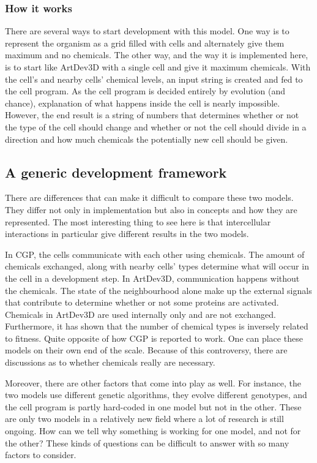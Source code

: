 \subsubsection{How it works}
There are several ways to start development with this model. One way is to represent the organism as a grid filled with cells and alternately give them maximum and no chemicals. The other way, and the way it is implemented here, is to start like ArtDev3D with a single cell and give it maximum chemicals. With the cell's and nearby cells' chemical levels, an input string is created and fed to the cell program. As the cell program is decided entirely by evolution (and chance), explanation of what happens inside the cell is nearly impossible. However, the end result is a string of numbers that determines whether or not the type of the cell should change and whether or not the cell should divide in a direction and how much chemicals the potentially new cell should be given.


\subsection{A generic development framework}
There are differences that can make it difficult to compare these two models. They differ not only in implementation but also in concepts and how they are represented. The most interesting thing to see here is that intercellular interactions in particular give different results in the two models.

In CGP, the cells communicate with each other using chemicals. The amount of chemicals exchanged, along with nearby cells' types determine what will occur in the cell in a development step. In ArtDev3D, communication happens without the chemicals. The state of the neighbourhood alone make up the external signals that contribute to determine whether or not some proteins are activated. Chemicals in ArtDev3D are used internally only and are not exchanged. Furthermore, it has shown that the number of chemical types is inversely related to fitness. Quite opposite of how CGP is reported to work. One can place these models on their own end of the scale. Because of this controversy, there are discussions as to whether chemicals really are necessary.

Moreover, there are other factors that come into play as well. For instance, the two models use different genetic algorithms, they evolve different genotypes, and the cell program is partly hard-coded in one model but not in the other. These are only two models in a relatively new field where a lot of research is still ongoing. How can we tell why something is working for one model, and not for the other? These kinds of questions can be difficult to answer with so many factors to consider.

